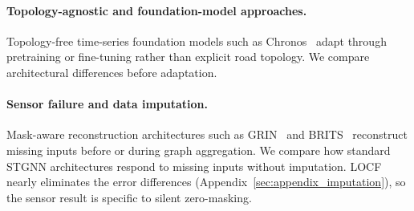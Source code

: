 \paragraph{Topology-agnostic and foundation-model approaches.}
Topology-free time-series foundation models such as
Chronos~\citep{ansari2024chronos} adapt through pretraining or fine-tuning
rather than explicit road topology. We compare architectural differences before adaptation.

\paragraph{Sensor failure and data imputation.}
Mask-aware reconstruction architectures such as GRIN~\citep{cini2022grin} and
BRITS~\citep{cao2018brits} reconstruct missing inputs before or during graph
aggregation. We compare how standard STGNN architectures respond to missing
inputs without imputation. LOCF nearly eliminates the error differences
(Appendix~\ref{sec:appendix_imputation}), so the sensor result is specific to
silent zero-masking.
